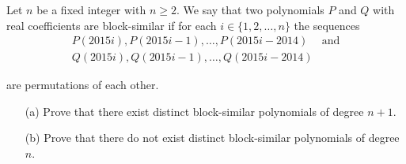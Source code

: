 Let 
$n$
 be a fixed integer with 
$n \ge 2$.
 We say that two polynomials 
$P$
 and 
$Q$
 with real coefficients are 
block-similar
 if for each 
$i \in \{1, 2, \ldots, n\}$
 the sequences
\begin{eqnarray*}
P(2015i), P(2015i - 1), \ldots, P(2015i - 2014) & \text{and}\\
Q(2015i), Q(2015i - 1), \ldots, Q(2015i - 2014)
\end{eqnarray*}

are permutations of each other.

\begin{itemize}
	\item[(a)] Prove that there exist distinct block-similar polynomials of degree 
	$n + 1$.
	
	\item[(b)] Prove that there do not exist distinct block-similar polynomials of degree 
	$n$.

\end{itemize}